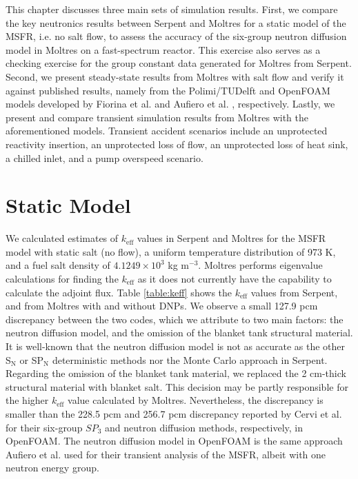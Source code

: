 This chapter discusses three main sets of simulation results. First, we
compare the key neutronics results between Serpent and Moltres for a static
model of the \gls{MSFR}, i.e. no salt flow, to assess the accuracy of the
six-group neutron diffusion model in Moltres on a fast-spectrum reactor. This
exercise also serves as a checking exercise for the group constant data
generated for Moltres from Serpent. Second, we present steady-state results
from Moltres with salt flow and verify it against published results, namely
from the Polimi/TUDelft and OpenFOAM models developed by Fiorina et al.
\cite{fiorina_modelling_2014} and Aufiero et al.
\cite{aufiero_development_2014}, respectively. Lastly, we present and compare
transient simulation results from Moltres with the aforementioned models.
Transient accident scenarios include an unprotected reactivity insertion, an
unprotected loss of flow, an unprotected loss of heat sink, a chilled inlet,
and a pump overspeed scenario.

\section{Static Model}

We calculated estimates of $k_{\text{eff}}$ values in Serpent and Moltres for
the \gls{MSFR} model with static salt (no flow), a uniform temperature
distribution of 973 K, and a fuel salt density of $4.1249 \times 10^3$ kg
m$^{-3}$. Moltres performs eigenvalue calculations for finding the 
$k_{\text{eff}}$ as it does not currently have the capability to calculate
the adjoint flux. Table \ref{table:keff} shows the $k_{\text{eff}}$ values
from Serpent, and from Moltres with and without \glspl{DNP}. We observe a
small 127.9 pcm discrepancy between the two codes, which we attribute to two
main factors: the neutron diffusion model, and the omission of the blanket
tank structural material. It is well-known that the neutron diffusion model is
not as accurate as the other S$_{\text{N}}$ or SP$_{\text{N}}$ deterministic
methods nor the Monte Carlo approach in Serpent. Regarding the omission of the
blanket tank material, we replaced the 2 cm-thick structural material with
blanket salt. This decision may be partly responsible for the higher
$k_{\text{eff}}$ value calculated by Moltres. Nevertheless, the discrepancy is
smaller than the 228.5 pcm and 256.7 pcm discrepancy reported by Cervi et al.
\cite{cervi_development_2019} for their six-group $SP_3$ and neutron diffusion
methods, respectively, in OpenFOAM. The neutron diffusion model in OpenFOAM is
the same approach Aufiero et al. \cite{aufiero_development_2014} used for
their transient analysis of the \gls{MSFR}, albeit with one neutron energy
group. 

